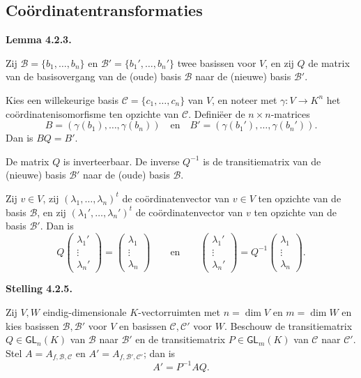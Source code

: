 \documentclass[10pt,a4paper]{article}
\newenvironment{res}[2]{%
  \par\noindent\textbf{#1 #2.}%
}{%
  \par\vspace{2pt}\normalfont
}
\begin{document}
\subsection{Coördinatentransformaties}
\begin{res}{Lemma}{4.2.3}
Zij $\mathcal B=\{b_1,\dots,b_n\}$ en $\mathcal B'=\{b_1',\dots,b_n'\}$ twee basissen voor $V$, en zij $Q$ de matrix van de basisovergang van de (oude) basis $\mathcal B$ naar de (nieuwe) basis $\mathcal B'$.
\begin{myenum}
\item Kies een willekeurige basis $\mathcal C=\{c_1,\dots,c_n\}$ van $V$, en noteer met $\gamma:V\to K^n$ het co\"ordinatenisomorfisme ten opzichte van $\mathcal C$. Defini\"eer de $n\times n$-matrices
\[
B=(\gamma(b_1),\dots,\gamma(b_n)) \quad\text{en}\quad B'=(\gamma(b_1'),\dots,\gamma(b_n')).
\]
Dan is $BQ=B'$.
\item De matrix $Q$ is inverteerbaar. De inverse $Q^{-1}$ is de transitiematrix van de (nieuwe) basis $\mathcal B'$ naar de (oude) basis $\mathcal B$.
\item Zij $v\in V$, zij $(\lambda_1,\dots,\lambda_n)^t$ de co\"ordinatenvector van $v\in V$ ten opzichte van de basis $\mathcal B$, en zij $(\lambda_1',\dots,\lambda_n')^t$ de co\"ordinatenvector van $v$ ten opzichte van de basis $\mathcal B'$. Dan is
\[
Q\begin{pmatrix}\lambda_1'\\ \vdots \\ \lambda_n'\end{pmatrix} = \begin{pmatrix}\lambda_1\\ \vdots \\ \lambda_n\end{pmatrix} \qquad\text{en}\qquad \begin{pmatrix}\lambda_1'\\ \vdots \\ \lambda_n'\end{pmatrix} = Q^{-1}\begin{pmatrix}\lambda_1\\ \vdots \\ \lambda_n\end{pmatrix}.
\]
\end{myenum}
\end{res}

\begin{res}{Stelling}{4.2.5}
Zij $V,W$ eindig-dimensionale $K$-vectorruimten met $n=\dim V$ en $m=\dim W$ en kies basissen $\mathcal B,\mathcal B'$ voor $V$ en basissen $\mathcal C,\mathcal C'$ voor $W$. Beschouw de transitiematrix $Q\in \mathsf{GL}_n(K)$ van $\mathcal B$ naar $\mathcal B'$ en de transitiematrix $P\in \mathsf{GL}_m(K)$ van $\mathcal C$ naar $\mathcal C'$. Stel $A=A_{f,\mathcal B,\mathcal C}$ en $A'=A_{f,\mathcal B',\mathcal C'}$; dan is
\[
A'=P^{-1}AQ.
\]
\end{res}
\end{document}
